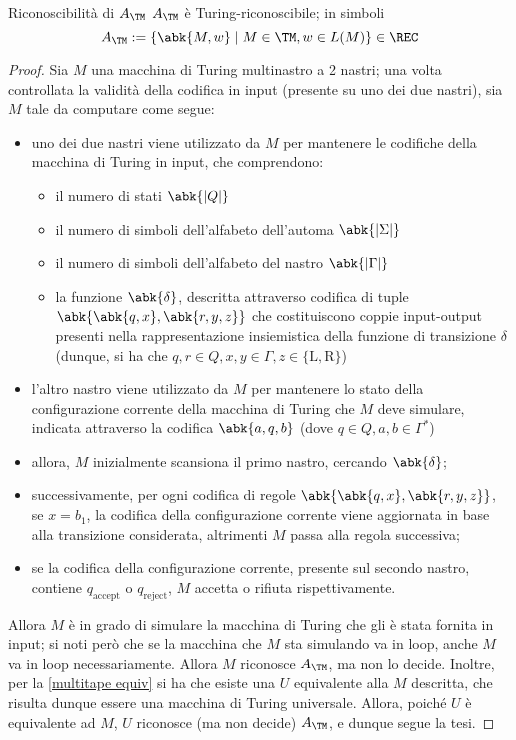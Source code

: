 \documentclass[a4paper, 12pt]{report}
\begin{document}
    \begin{framedthm}[label={a_tm in rec}]{Riconoscibilità di $A_\TM$}
        $A_\TM$ è Turing-riconoscibile; in simboli $$A_\TM := \{\abk{M, w} \mid M \in \TM, w \in L(M)\} \in \REC$$
    \end{framedthm}

    \begin{proof}
        Sia $M$ una macchina di Turing multinastro a 2 nastri; una volta controllata la validità della codifica in input (presente su uno dei due nastri), sia $M$ tale da computare come segue:

        \begin{itemize}
            \item uno dei due nastri viene utilizzato da $M$ per mantenere le codifiche della macchina di Turing in input, che comprendono:
                \begin{itemize}
                    \item il numero di stati $\abk{|Q|}$
                    \item il numero di simboli dell'alfabeto dell'automa $\abk{|\Sigma|}$
                    \item il numero di simboli dell'alfabeto del nastro $\abk{|\Gamma|}$
                    \item la funzione $\abk{\delta}$, descritta attraverso codifica di tuple $\abk{\abk{q, x}, \abk{r, y, z}}$ che costituiscono coppie input-output presenti nella rappresentazione insiemistica della funzione di transizione $\delta$ (dunque, si ha che $q, r \in Q, x, y \in \Gamma, z \in \{\mathrm L ,\mathrm R\}$)
                \end{itemize}
            \item l'altro nastro viene utilizzato da $M$ per mantenere lo stato della configurazione corrente della macchina di Turing che $M$ deve simulare, indicata attraverso la codifica $\abk{a, q, b}$ (dove $q \in Q, a, b \in \Gamma^*$)
            \item allora, $M$ inizialmente scansiona il primo nastro, cercando $\abk{\delta}$;
            \item successivamente, per ogni codifica di regole $\abk{\abk{q, x}, \abk{r, y, z}}$, se $x = b_1$, la codifica della configurazione corrente viene aggiornata in base alla transizione considerata, altrimenti $M$ passa alla regola successiva;
            \item se la codifica della configurazione corrente, presente sul secondo nastro, contiene $q_\mathrm{accept}$ o $q_\mathrm{reject}$, $M$ accetta o rifiuta rispettivamente.
        \end{itemize}

        Allora $M$ è in grado di simulare la macchina di Turing che gli è stata fornita in input; si noti però che se la macchina che $M$ sta simulando va in loop, anche $M$ va in loop necessariamente. Allora $M$ riconosce $A_\TM$, ma non lo decide. Inoltre, per la \cref{multitape equiv} si ha che esiste una \TM $U$ equivalente alla $M$ descritta, che risulta dunque essere una macchina di Turing universale. Allora, poiché $U$ è equivalente ad $M$, $U$ riconosce (ma non decide) $A_\TM$, e dunque segue la tesi.
    \end{proof}
\end{document}
